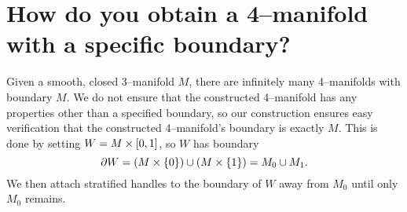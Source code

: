 \chapter[Background]{How do you obtain a 4--manifold with a specific boundary?}
\label{chapter:problem}

Given a smooth, closed 3--manifold $M$, there are infinitely many 4--manifolds with boundary $M$.
We do not ensure that the constructed 4--manifold has any properties other than a specified boundary, so our construction ensures easy verification that the constructed 4--manifold's boundary is exactly $M$.
This is done by setting $W=M\times [0,1]$, so $W$ has boundary 
\[
	\partial W = (M\times\{0\}) \cup (M\times\{1\}) = M_0 \cup M_1.
\]
We then attach stratified handles to the boundary of $W$ away from $M_0$ until only $M_0$ remains.







